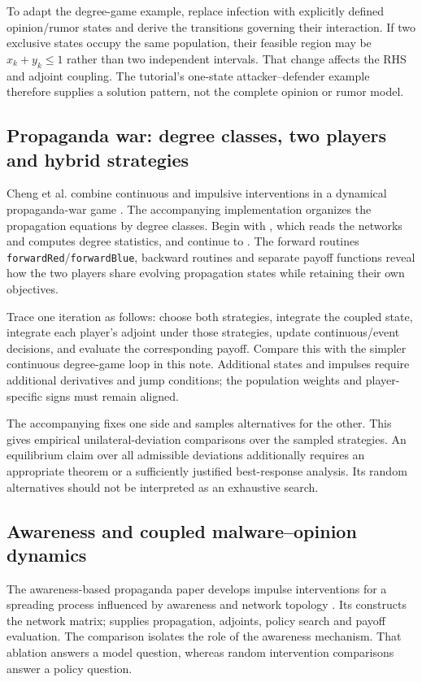 \documentclass[11pt,a4paper]{article}
\theoremstyle{definition}
\theoremstyle{remark}
\begin{document}
To adapt the degree-game example, replace infection with explicitly defined opinion/rumor states and derive the transitions governing their interaction. If two exclusive states occupy the same population, their feasible region may be $x_k+y_k\leq1$ rather than two independent intervals. That change affects the RHS and adjoint coupling. The tutorial's one-state attacker--defender example therefore supplies a solution pattern, not the complete opinion or rumor model.

\subsection{Propaganda war: degree classes, two players and hybrid strategies}
Cheng et al. combine continuous and impulsive interventions in a dynamical propaganda-war game \cite{war2024}. The accompanying implementation organizes the propagation equations by degree classes. Begin with , which reads the networks and computes degree statistics, and continue to . The forward routines \texttt{forwardRed}/\texttt{forwardBlue}, backward routines and separate payoff functions reveal how the two players share evolving propagation states while retaining their own objectives.

Trace one iteration as follows: choose both strategies, integrate the coupled state, integrate each player's adjoint under those strategies, update continuous/event decisions, and evaluate the corresponding payoff. Compare this with the simpler continuous degree-game loop in this note. Additional states and impulses require additional derivatives and jump conditions; the population weights and player-specific signs must remain aligned.

The accompanying  fixes one side and samples alternatives for the other. This gives empirical unilateral-deviation comparisons over the sampled strategies. An equilibrium claim over all admissible deviations additionally requires an appropriate theorem or a sufficiently justified best-response analysis. Its random alternatives should not be interpreted as an exhaustive search.

\subsection{Awareness and coupled malware--opinion dynamics}
The awareness-based propaganda paper develops impulse interventions for a spreading process influenced by awareness and network topology \cite{awareness2025}. Its  constructs the network matrix;  supplies propagation, adjoints, policy search and payoff evaluation. The  comparison isolates the role of the awareness mechanism. That ablation answers a model question, whereas random intervention comparisons answer a policy question.
\end{document}
